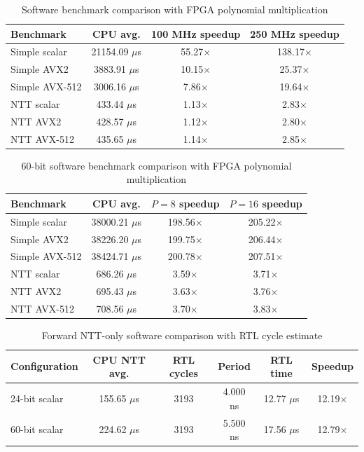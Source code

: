 \documentclass[a4paper, 12pt, titlepage]{article}
\begin{document}
\begin{table}[H]
\centering
\small
\caption{Software benchmark comparison with FPGA polynomial multiplication}
\label{tab:software-fpga-comparison}
\begin{tabular}{|l|c|c|c|}
\hline
\textbf{Benchmark} & \textbf{CPU avg.} & \textbf{100 MHz speedup} & \textbf{250 MHz speedup} \\
\hline
Simple scalar & 21154.09 $\mu$s & 55.27$\times$ & 138.17$\times$ \\
\hline
Simple AVX2 & 3883.91 $\mu$s & 10.15$\times$ & 25.37$\times$ \\
\hline
Simple AVX-512 & 3006.16 $\mu$s & 7.86$\times$ & 19.64$\times$ \\
\hline
NTT scalar & 433.44 $\mu$s & 1.13$\times$ & 2.83$\times$ \\
\hline
NTT AVX2 & 428.57 $\mu$s & 1.12$\times$ & 2.80$\times$ \\
\hline
NTT AVX-512 & 435.65 $\mu$s & 1.14$\times$ & 2.85$\times$ \\
\hline
\end{tabular}
\end{table}

\begin{table}[H]
\centering
\small
\caption{60-bit software benchmark comparison with FPGA polynomial multiplication}
\label{tab:software-60bit-fpga-comparison}
\begin{tabular}{|l|c|c|c|}
\hline
\textbf{Benchmark} & \textbf{CPU avg.} & \textbf{$P=8$ speedup} & \textbf{$P=16$ speedup} \\
\hline
Simple scalar & 38000.21 $\mu$s & 198.56$\times$ & 205.22$\times$ \\
\hline
Simple AVX2 & 38226.20 $\mu$s & 199.75$\times$ & 206.44$\times$ \\
\hline
Simple AVX-512 & 38424.71 $\mu$s & 200.78$\times$ & 207.51$\times$ \\
\hline
NTT scalar & 686.26 $\mu$s & 3.59$\times$ & 3.71$\times$ \\
\hline
NTT AVX2 & 695.43 $\mu$s & 3.63$\times$ & 3.76$\times$ \\
\hline
NTT AVX-512 & 708.56 $\mu$s & 3.70$\times$ & 3.83$\times$ \\
\hline
\end{tabular}
\end{table}

\begin{table}[H]
\centering
\small
\caption{Forward NTT-only software comparison with RTL cycle estimate}
\label{tab:forward-ntt-software-hardware-comparison}
\begin{tabular}{|l|c|c|c|c|c|}
\hline
\textbf{Configuration} & \textbf{CPU NTT avg.} & \textbf{RTL cycles} & \textbf{Period} & \textbf{RTL time} & \textbf{Speedup} \\
\hline
24-bit scalar & 155.65 $\mu$s & 3193 & 4.000 ns & 12.77 $\mu$s & 12.19$\times$ \\
\hline
60-bit scalar & 224.62 $\mu$s & 3193 & 5.500 ns & 17.56 $\mu$s & 12.79$\times$ \\
\hline
\end{tabular}
\end{table}
\end{document}
